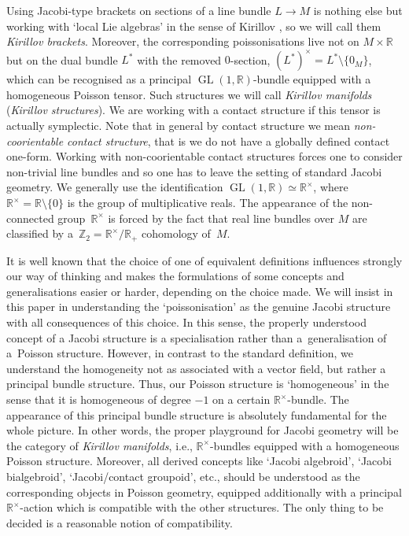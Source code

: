 \documentclass[pdftex]{sigma}
\DeclareMathOperator{\GL}{GL}
\newcommand{\R}{{\mathbb R}}
\newcommand{\ti}{\times}
\def\Rt{{\R^\times}}
\numberwithin{equation}{section}
\begin{document}
Using Jacobi-type brackets on sections of a line bundle $L\to M$ is nothing else but working with `local Lie algebras' in the sense of Kirillov \cite{Kirillov:1976}, so we will call them \emph{Kirillov brackets}. Moreover, the corresponding poissonisations live not on $M\ti\R$ but on the dual bundle $L^*$ with the removed $0$-section, $(L^*)^\ti=L^*\setminus\{ 0_M\}$, which can be recognised as a principal $\GL(1,\R)$-bundle equipped with a homogeneous Poisson tensor. Such structures we will call \emph{Kirillov manifolds} (\emph{Kirillov structures}). We are working with a contact structure if this tensor is actually symplectic. Note that in general by contact structure we mean \emph{non-coorientable contact structure}, that is we do not have a globally def\/ined contact one-form. Working with non-coorientable contact structures forces one to consider non-trivial line bundles and so one has to leave the setting of standard Jacobi geometry. We generally use the identif\/ication $\GL(1,\R)\simeq\R^\times$, where $\R^\times=\R\setminus\{ 0\}$ is the group of multiplicative reals. The appearance of the non-connected group~$\R^\ti$ is forced by the fact that real line bundles over $M$ are classif\/ied by a~$\mathbb{Z}_2=\R^\ti/\R_+$ cohomology of~$M$.

It is well known that the choice of one of equivalent def\/initions inf\/luences strongly our way of thinking and makes the formulations of some concepts and generalisations easier or harder, depending on the choice made. We will insist in this paper in understanding the `poissonisation' as the genuine Jacobi structure with all consequences of this choice. In this sense, the properly understood concept of a Jacobi structure is a specialisation rather than a~generalisation of a~Poisson structure. However, in contrast to the standard def\/inition, we understand the homogeneity not as associated with a vector f\/ield, but rather a principal bundle structure. Thus, our Poisson structure is `homogeneous' in the sense that it is homogeneous of degree $-1$ on a certain $\Rt$-bundle. The appearance of this principal bundle structure is absolutely fundamental for the whole picture. In other words, the proper playground for Jacobi geometry will be the category of \emph{Kirillov manifolds}, i.e., $\Rt$-bundles equipped with a homogeneous Poisson structure. Moreover, all derived concepts like `Jacobi algebroid', `Jacobi bialgebroid', `Jacobi/contact groupoid', etc., should be understood as the corresponding objects in Poisson geometry, equipped additionally with a principal $\R^\ti$-action which is compatible with the other structures. The only thing to be decided is a reasonable notion of compatibility.
\end{document}
